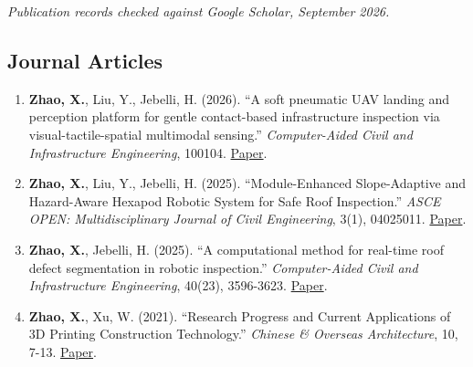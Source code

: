 \noindent\textit{Publication records checked against Google Scholar, September 2026.}

\subsection*{Journal Articles}
\begin{enumerate}[leftmargin=1.5em]
\item \textbf{Zhao, X.}, Liu, Y., Jebelli, H. (2026). ``A soft pneumatic UAV landing and perception platform for gentle contact-based infrastructure inspection via visual-tactile-spatial multimodal sensing.'' \textit{Computer-Aided Civil and Infrastructure Engineering}, 100104. \href{https://www.sciencedirect.com/science/article/pii/S1093968726030902}{Paper}.
\item \textbf{Zhao, X.}, Liu, Y., Jebelli, H. (2025). ``Module-Enhanced Slope-Adaptive and Hazard-Aware Hexapod Robotic System for Safe Roof Inspection.'' \textit{ASCE OPEN: Multidisciplinary Journal of Civil Engineering}, 3(1), 04025011. \href{https://ascelibrary.org/doi/abs/10.1061/AOMJAH.AOENG-0088}{Paper}.
\item \textbf{Zhao, X.}, Jebelli, H. (2025). ``A computational method for real-time roof defect segmentation in robotic inspection.'' \textit{Computer-Aided Civil and Infrastructure Engineering}, 40(23), 3596-3623. \href{https://onlinelibrary.wiley.com/doi/abs/10.1111/mice.13471}{Paper}.
\item \textbf{Zhao, X.}, Xu, W. (2021). ``Research Progress and Current Applications of 3D Printing Construction Technology.'' \textit{Chinese \& Overseas Architecture}, 10, 7-13. \href{https://scholar.google.com/citations?view_op=view_citation&hl=en&user=a1trBDoAAAAJ&citation_for_view=a1trBDoAAAAJ:9yKSN-GCB0IC}{Paper}.
\end{enumerate}

